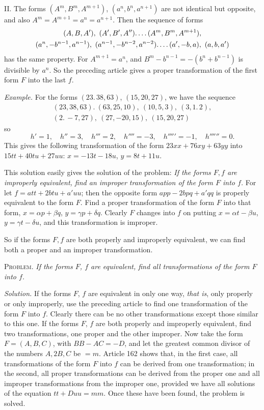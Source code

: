 II. The forms $(A^m,B^m,A^{m+1})$, $(a^n,b^n,a^{n+1})$ are not identical but opposite, and also $A^m=A^{m+1}=a^n=a^{n+1}$. Then the sequence of forms
\[
\begin{gathered}
(A,B,A'),\ (A',B',A'')\ldotp\ldotp\ldotp\ldotp(A^m,B^m,A^{m+1}),\\
(a^n,-b^{n-1},a^{n-1}),\ (a^{n-1},-b^{n-2},a^{n-2})\ldotp\ldotp\ldotp\ldotp(a',-b,a),\ (a,b,a')
\end{gathered}
\]
has the same property. For $A^{m+1}=a^n$, and $B^m-b^{n-1}=-(b^n+b^{n-1})$ is divisible by $a^n$. So the preceding article gives a proper transformation of the first form $F$ into the last $f$.

\emph{Example.} For the forms $(23.\,38,63)$, $(15,20,27)$, we have the sequence
\[
\begin{gathered}
(23,38,63).\ (63,25,10),\ (10,5,3),\ (3,1.\,2),\\
(2.\,-7,27),\ (27,-20,15),\ (15,20,27)
\end{gathered}
\]
so
\[
h'=1,\quad h''=3,\quad h'''=2,\quad h''''=-3,\quad h'''''=-1,\quad h''''''=0.
\]
This gives the following transformation of the form $23xx+76xy+63yy$ into $15tt+40tu+27uu$: $x=-13t-18u$, $y=8t+11u$.

This solution easily gives the solution of the problem: \emph{If the forms $F,f$ are improperly equivalent, find an improper transformation of the form $F$ into $f$.} For let $f=att+2btu+a'uu$; then the opposite form $app-2bpq+a'qq$ is properly equivalent to the form $F$. Find a proper transformation of the form $F$ into that form, $x=\alpha p+\beta q$, $y=\gamma p+\delta q$. Clearly $F$ changes into $f$ on putting $x=\alpha t-\beta u$, $y=\gamma t-\delta u$, and this transformation is improper.

So if the forms $F,f$ are both properly and improperly equivalent, we can find both a proper and an improper transformation.

\textsc{Problem.} \emph{If the forms $F$, $f$ are equivalent, find all transformations of the form $F$ into $f$.}

\emph{Solution.} If the forms $F$, $f$ are equivalent in only one way, \emph{that is}, only properly or only improperly, use the preceding article to find one transformation of the form $F$ into $f$. Clearly there can be no other transformations except those similar to this one. If the forms $F$, $f$ are both properly and improperly equivalent, find two transformations, one proper and the other improper. Now take the form $F=(A,B,C)$, with $BB-AC=-D$, and let the greatest common divisor of the numbers $A,2B,C$ be $=m$. Article 162 shows that, in the first case, all transformations of the form $F$ into $f$ can be derived from one transformation; in the second, all proper transformations can be derived from the proper one and all improper transformations from the improper one, provided we have all solutions of the equation $tt+Duu=mm$. Once these have been found, the problem is solved.

